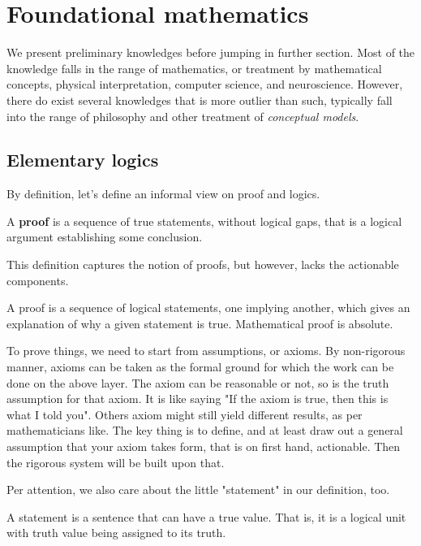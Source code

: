 \chapter{Foundational mathematics}
We present preliminary knowledges before jumping in further section. Most of the knowledge falls in the range of mathematics, or treatment by mathematical concepts, physical interpretation, computer science, and neuroscience. However, there do exist several knowledges that is more outlier than such, typically fall into the range of philosophy and other treatment of \textit{conceptual models}. 
\section{Elementary logics}
By definition, let's define an informal view on  proof and  logics. 

\begin{definition}[Proof, I]
    A \textbf{proof} is a sequence of true statements, without logical gaps, that is a logical argument establishing some conclusion. 
\end{definition}

This definition captures the notion of proofs, but however, lacks the actionable components. 

\begin{definition}[Proof, II]
    A proof is a sequence of logical statements, one implying another, which gives an explanation of why a given statement is true. Mathematical proof is absolute.
\end{definition}

To prove things, we need to start from assumptions, or axioms. By non-rigorous manner, axioms can be taken as the formal ground for which the work can be done on the above layer. The axiom can be reasonable or not, so is the truth assumption for that axiom. It is like saying "If the axiom is true, then this is what I told you". Others axiom might still yield different results, as per mathematicians like. The key thing is to define, and at least draw out a general assumption that your axiom takes form, that is on first hand, actionable. Then the rigorous system will be built upon that. 

Per attention, we also care about the little "statement" in our definition, too. 
\begin{definition}[Statements, I]
    A statement is a sentence that can have a true value. That is, it is a logical unit with truth value being assigned to its truth. 
\end{definition}


